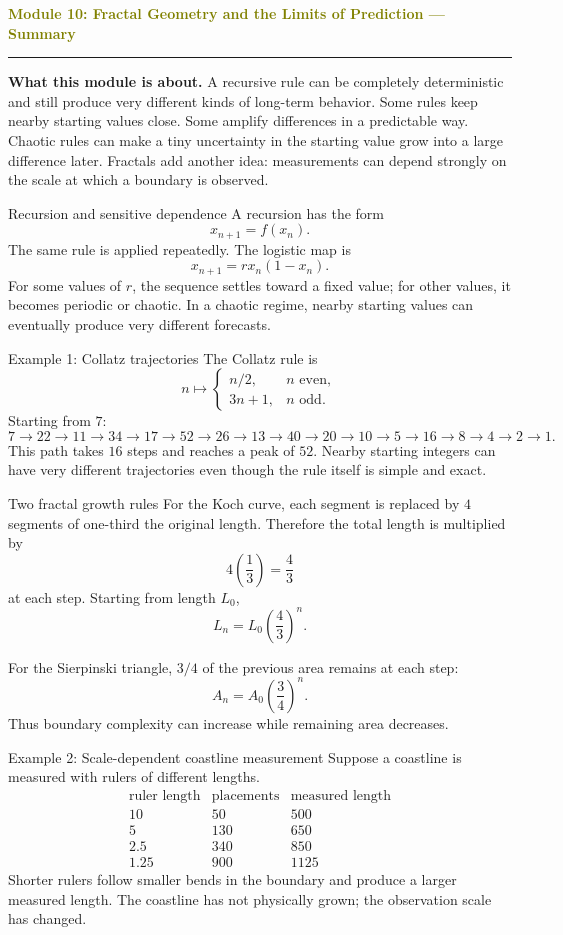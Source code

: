\documentclass[11pt]{article}
\newcommand{\summaryhead}[2]{%
  \clearpage
  {\Large\bfseries\textcolor{olive}{Module #1: #2 — Summary}}\par
  \vspace{2pt}\textcolor{gold}{\rule{\linewidth}{1.2pt}}\par\smallskip
}
\begin{document}
\summaryhead{10}{Fractal Geometry and the Limits of Prediction}

\textbf{What this module is about.} A recursive rule can be completely deterministic and still produce very different kinds of long-term behavior. Some rules keep nearby starting values close. Some amplify differences in a predictable way. Chaotic rules can make a tiny uncertainty in the starting value grow into a large difference later. Fractals add another idea: measurements can depend strongly on the scale at which a boundary is observed.

\begin{keybox}{Recursion and sensitive dependence}
A recursion has the form
\[
x_{n+1}=f(x_n).
\]
The same rule is applied repeatedly. The logistic map is
\[
x_{n+1}=rx_n(1-x_n).
\]
For some values of \(r\), the sequence settles toward a fixed value; for other values, it becomes periodic or chaotic. In a chaotic regime, nearby starting values can eventually produce very different forecasts.
\end{keybox}

\begin{examplebox}{Example 1: Collatz trajectories}
The Collatz rule is
\[
n\mapsto\begin{cases}
 n/2,&n\text{ even},\\
 3n+1,&n\text{ odd}.
\end{cases}
\]
Starting from \(7\):
\[
7\to22\to11\to34\to17\to52\to26\to13\to40\to20\to10\to5\to16\to8\to4\to2\to1.
\]
This path takes \(16\) steps and reaches a peak of \(52\). Nearby starting integers can have very different trajectories even though the rule itself is simple and exact.
\end{examplebox}

\begin{keybox}{Two fractal growth rules}
For the Koch curve, each segment is replaced by \(4\) segments of one-third the original length. Therefore the total length is multiplied by
\[
4\left(\frac13\right)=\frac43
\]
at each step. Starting from length \(L_0\),
\[
L_n=L_0\left(\frac43\right)^n.
\]

For the Sierpinski triangle, \(3/4\) of the previous area remains at each step:
\[
A_n=A_0\left(\frac34\right)^n.
\]
Thus boundary complexity can increase while remaining area decreases.
\end{keybox}

\begin{examplebox}{Example 2: Scale-dependent coastline measurement}
Suppose a coastline is measured with rulers of different lengths.
\[
\begin{array}{c|c|c}
\text{ruler length} & \text{placements} & \text{measured length}\\\hline
10 & 50 & 500\\
5 & 130 & 650\\
2.5 & 340 & 850\\
1.25 & 900 & 1125
\end{array}
\]
Shorter rulers follow smaller bends in the boundary and produce a larger measured length. The coastline has not physically grown; the observation scale has changed.
\end{examplebox}
\end{document}
